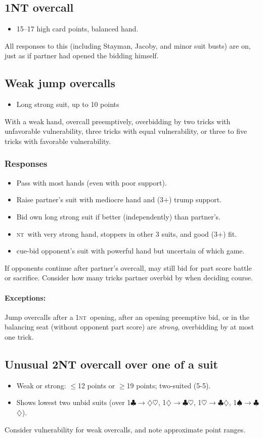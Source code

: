 \documentclass[10pt]{article}
\def\C{$\clubsuit$}
\def\D{$\diamondsuit$}
\def\H{$\heartsuit$}
\def\S{$\spadesuit$}
\def\NT{\textsc{nt}}
\let\TeXto\to
\let\TeXge\ge
\let\TeXle\le
\def\to{$\TeXto$}
\def\le{$\TeXle$}
\def\ge{$\TeXge$}
\def\except#1{\paragraph{\exceptparfont\bf Exceptions:}{\exceptfont #1}}
\renewcommand{\bullet}[1]{\begin{itemize}\item#1\end{itemize}\vspace*{-0.5pc}}
\newcommand{\crunch}[1][1]{\vspace*{-#1pc}}
\newenvironment{mylist}[1][.5]{\begin{itemize}\itemsep=-#1\baselineskip}{\end{itemize}}
\begin{document}
\subsection{1NT overcall}
\bullet{15--17 high card points, balanced hand.}
All responses to this (including Stayman, Jacoby, and minor suit busts) are
on, just as if partner had opened the bidding himself.

\subsection{Weak jump overcalls}
\bullet{Long strong suit, up to 10 points}
With a weak hand, overcall preemptively, overbidding by two tricks with
unfavorable vulnerability, three tricks with equal vulnerability, or 
three to five tricks with favorable vulnerability.

\subsubsection{Responses}
\begin{mylist}[0.5]
\item Pass with most hands (even with poor support).
\item Raise partner's suit with mediocre hand and (3+) trump support.
\item Bid own long strong suit if better (independently) than partner's.
\item \NT\ with very strong hand, stoppers in other 3 suits, and good (3+) fit.
\item cue-bid opponent's suit with powerful hand but uncertain of which game.
\end{mylist}
If opponents continue after partner's overcall, may still bid for part
score battle or sacrifice.  Consider how many tricks partner overbid by when
deciding course.\crunch
\except{Jump overcalls after a 1\NT\ opening, after an opening preemptive
bid, or in the balancing seat (without opponent part score) are \emph{strong},
overbidding by at most one trick.}

\eject
\subsection{Unusual 2NT overcall over one of a suit}
\begin{mylist}[.3]
\item Weak or strong: \le12 points or \ge19 points; two-suited (5-5).
\item Shows lowest two unbid suits (over 1\C\to\D\H, 1\D\to\C\H, 1\H\to\C\D, 1\S\to\C\D).
\end{mylist}\crunch[.4]
Consider vulnerability for weak overcalls, and note approximate point ranges.
\end{document}
